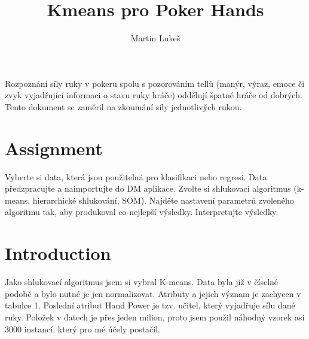 \documentclass[journal]{IEEEtran}
\begin{document}
%
\title{Kmeans pro Poker Hands}
\author{Martin Luke\v{s}
}

\maketitle


\begin{abstrakt}
Rozpozn\'an\'i s\'ily ruky v pokeru spolu s pozorov\'an\'im tell\r{u} (man\'yr, v\'yraz, emoce \v{c}i zvyk vyjad\v{r}uj\'{i}c\'{i} informaci o stavu ruky hr\'{a}\v{c}e) odd\v{e}luj\'i \v{s}patn\'{e} hr\'a\v{c}e od dobr\'ych. Tento dokument se zam\v{e}ril na zkoum\'{a}n\'{i} s\'{i}ly jednotliv\v{y}ch rukou.
\end{abstrakt}

\section{Assignment}
Vyberte si data, kter\'{a} jsou pou\v{z}iteln\'{a} pro klasifikaci nebo
regresi. Data p\v{r}edzpracujte a naimportujte do DM aplikace.
Zvolte si shlukovac\'{i} algoritmus (k-means, hierarchick\'{e} shlukov\'{a}n\'{i},
SOM). Najd\v{e}te nastaven\'{i} parametr\r{u} zvolen\'{e}ho algoritmu tak,
aby produkoval co nejlep\v{s}\'{i} v\'{y}sledky. Interpretujte v\'{y}sledky.

\section{Introduction}
 Jako shlukovac\'{i} algoritmus jsem si vybral K-means. Data byla ji\v{z} v \v{c}\'{i}seln\'{e} podob\v{e} a bylo nutn\'{e} je jen normalizovat.
Atributy a jejich v\'{y}znam je zachycen v tabulce 1. Posledn\'{i} atribut Hand Power je tzv. u\v{c}itel, kter\'{y} vyjad\v{r}uje s\'{i}lu dan\'{e} ruky. Polo\v{z}ek v datech je p\v{r}es jeden milion, proto jsem pou\v{z}il n\'{a}hodn\'{y} vzorek asi 3000 instanc\'{i}, kter\'{y} pro m\'{e} \'{u}\v{c}ely posta\v{c}il.
%
\end{document}
